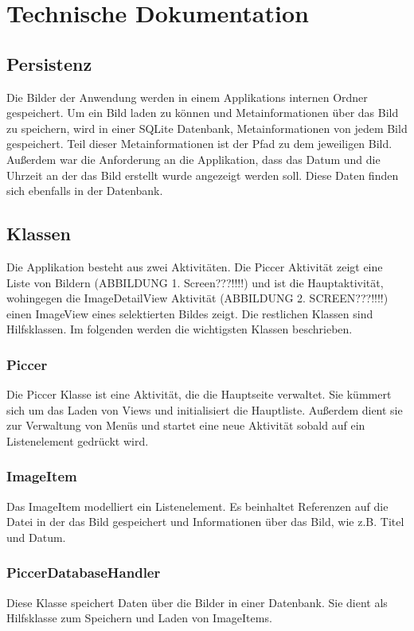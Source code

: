 \chapter{Technische Dokumentation}

\section{Persistenz}
Die Bilder der Anwendung werden in einem Applikations internen Ordner gespeichert.
Um ein Bild laden zu können und Metainformationen über das Bild zu speichern,
wird in einer SQLite Datenbank, Metainformationen von jedem Bild gespeichert.
Teil dieser Metainformationen ist der Pfad zu dem jeweiligen Bild.
Außerdem war die Anforderung an die Applikation, dass das Datum und die Uhrzeit an der das
Bild erstellt wurde angezeigt werden soll.
Diese Daten finden sich ebenfalls in der Datenbank.

\section{Klassen}
Die Applikation besteht aus zwei Aktivitäten. 
Die Piccer Aktivität zeigt eine Liste von Bildern (ABBILDUNG 1. Screen???!!!!) und ist die Hauptaktivität,
wohingegen die ImageDetailView Aktivität (ABBILDUNG 2. SCREEN???!!!!) einen ImageView eines selektierten Bildes zeigt.
Die restlichen Klassen sind Hilfsklassen.
Im folgenden werden die wichtigsten Klassen beschrieben.

\subsection{Piccer}
Die Piccer Klasse ist eine Aktivität, die die Hauptseite verwaltet.
Sie kümmert sich um das Laden von Views und initialisiert die Hauptliste.
Außerdem dient sie zur Verwaltung von Menüs und startet eine neue Aktivität sobald auf ein 
Listenelement gedrückt wird.

\subsection{ImageItem}
Das ImageItem modelliert ein Listenelement.
Es beinhaltet Referenzen auf die Datei in der das Bild gespeichert
und Informationen über das Bild, wie z.B. Titel und Datum.

\subsection{PiccerDatabaseHandler}
Diese Klasse speichert Daten über die Bilder in einer Datenbank.
Sie dient als Hilfsklasse zum Speichern und Laden von ImageItems.

